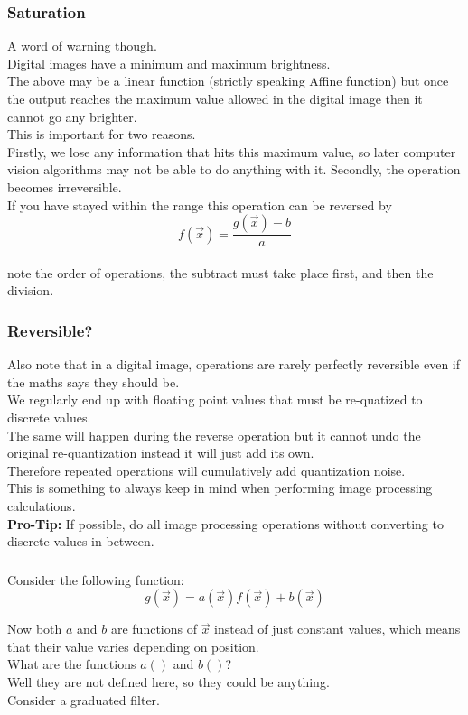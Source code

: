 \begin{frame}\frametitle{Saturation}
A word of warning though. \\Digital images have a minimum and maximum brightness. \\The above may be a linear function (strictly speaking Affine function) but once the output reaches the maximum value allowed in the digital image then it cannot go any brighter. \\This is important for two reasons.\\ Firstly, we lose any information that hits this maximum value, so later computer vision algorithms may not be able to do anything with it. Secondly, the operation becomes irreversible. \\
If you have stayed within the range this operation can be reversed by
\begin{equation}
    f(\vec{x}) = \frac{g(\vec{x}) - b}{a}
\end{equation} \\
note the order of operations, the subtract must take place first, and then the division. 
\end{frame}
\begin{frame}\frametitle{Reversible?}
Also note that in a digital image, operations are rarely perfectly reversible even if the maths says they should be. \\
We regularly end up with floating point values that must be re-quatized to discrete values. \\
The same will happen during the reverse operation but it cannot undo the original re-quantization instead it will just add its own.\\ Therefore repeated operations will cumulatively add quantization noise. \\
This is something to always keep in mind when performing image processing calculations. \\
\textbf{Pro-Tip:} If possible, do all image processing operations without converting to discrete values in between.
\end{frame}
\begin{frame}\frametitle{}
Consider the following function:
\begin{equation}
    g(\vec{x}) = a(\vec{x})f(\vec{x}) +b(\vec{x})
\end{equation}

Now both $a$ and $b$ are functions of $\vec{x}$ instead of just constant values, which means that their value varies depending on position. \\What are the functions $a()$ and $b()$? \\Well they are not defined here, so they could be anything. \\
Consider a graduated filter. 
\end{frame}
